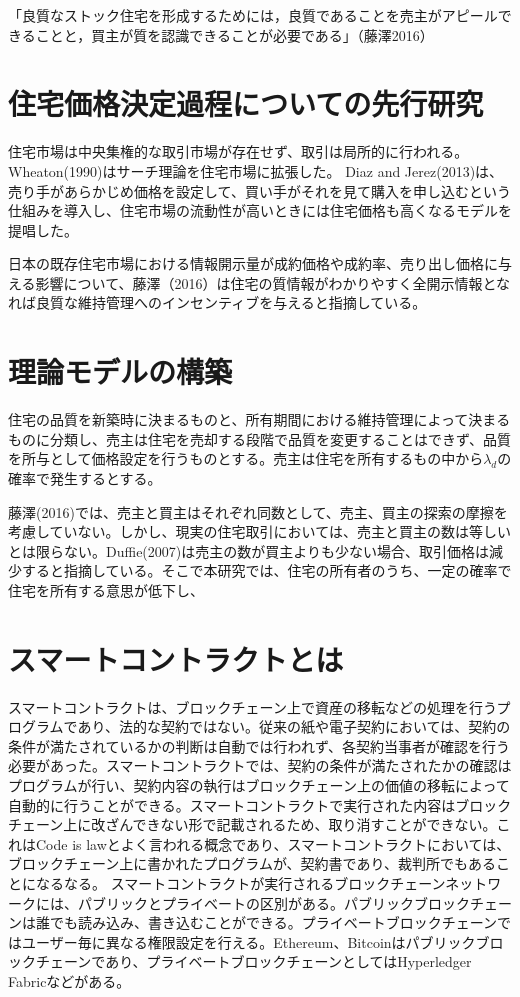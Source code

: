 \documentclass[a4paper,fontsize=11pt,report,notitlepage,line_length=38zw,number_of_lines=40]{jlreq}
\begin{document}
「良質なストック住宅を形成するためには，良質であることを売主がアピールできることと，買主が質を認識できることが必要である」（藤澤2016）\cite{fujisawa2016}


\chapter{住宅価格決定過程についての先行研究}
住宅市場は中央集権的な取引市場が存在せず、取引は局所的に行われる。
Wheaton(1990)はサーチ理論を住宅市場に拡張した。
Diaz and Jerez(2013)は、売り手があらかじめ価格を設定して、買い手がそれを見て購入を申し込むという仕組みを導入し、住宅市場の流動性が高いときには住宅価格も高くなるモデルを提唱した。

日本の既存住宅市場における情報開示量が成約価格や成約率、売り出し価格に与える影響について、藤澤（2016）\cite{fujisawa2016}は住宅の質情報がわかりやすく全開示情報となれば良質な維持管理へのインセンティブを与えると指摘している。

\chapter{理論モデルの構築}
住宅の品質を新築時に決まるものと、所有期間における維持管理によって決まるものに分類し、売主は住宅を売却する段階で品質を変更することはできず、品質を所与として価格設定を行うものとする。売主は住宅を所有するもの中から$\lambda_{d}$の確率で発生するとする。

藤澤(2016)では、売主と買主はそれぞれ同数として、売主、買主の探索の摩擦を考慮していない。しかし、現実の住宅取引においては、売主と買主の数は等しいとは限らない。Duffie(2007)は売主の数が買主よりも少ない場合、取引価格は減少すると指摘している。そこで本研究では、住宅の所有者のうち、一定の確率で住宅を所有する意思が低下し、

\chapter{スマートコントラクトとは}
スマートコントラクトは、ブロックチェーン上で資産の移転などの処理を行うプログラムであり、法的な契約ではない。従来の紙や電子契約においては、契約の条件が満たされているかの判断は自動では行われず、各契約当事者が確認を行う必要があった。スマートコントラクトでは、契約の条件が満たされたかの確認はプログラムが行い、契約内容の執行はブロックチェーン上の価値の移転によって自動的に行うことができる。スマートコントラクトで実行された内容はブロックチェーン上に改ざんできない形で記載されるため、取り消すことができない。これはCode is lawとよく言われる概念であり、スマートコントラクトにおいては、ブロックチェーン上に書かれたプログラムが、契約書であり、裁判所でもあることになるなる\cite{nagasawa2013}。
スマートコントラクトが実行されるブロックチェーンネットワークには、パブリックとプライベートの区別がある。パブリックブロックチェーンは誰でも読み込み、書き込むことができる。プライベートブロックチェーンではユーザー毎に異なる権限設定を行える。Ethereum、Bitcoinはパブリックブロックチェーンであり、プライベートブロックチェーンとしてはHyperledger Fabricなどがある。
\end{document}
